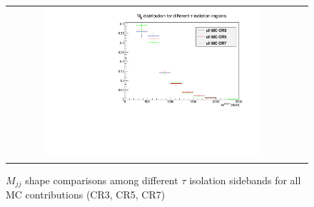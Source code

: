 \begin{figure}[tbh!]
	\centering
	\begin{tabular}{cc}
		\includegraphics[width=0.75\textwidth]{PLOTS/diTauHadLSotherPlots/LS_mjjshapestab_vs_tauiso_mc.pdf}
	\end{tabular}
	\caption{$M_{jj}$ shape comparisons among different $\tau$ isolation sidebands for all MC contributions (CR3, CR5, CR7)}
	\label{fig:LS_mjjshapestab_vs_tauiso_mc}
\end{figure}
